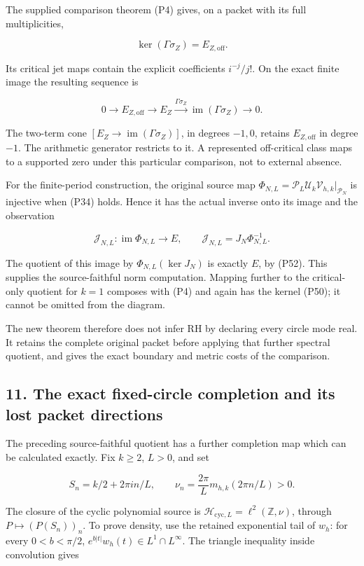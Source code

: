 The supplied comparison theorem (P4) gives, on a packet with its full multiplicities,

\[
\ker(\Gamma\sigma_Z)=E_{Z,\mathrm{off}}.
\tag{P50}
\]

Its critical jet maps contain the explicit coefficients \(i^{-j}/j!\). On the exact finite image the resulting sequence is

\[
0\to E_{Z,\mathrm{off}}\to E_Z
\xrightarrow{\Gamma\sigma_Z}\operatorname{im}(\Gamma\sigma_Z)\to0.
\tag{P51}
\]

The two-term cone \([E_Z\to\operatorname{im}(\Gamma\sigma_Z)]\), in degrees \(-1,0\), retains \(E_{Z,\mathrm{off}}\) in degree \(-1\). The arithmetic generator restricts to it. A represented off-critical class maps to a supported zero under this particular comparison, not to external absence.

For the finite-period construction, the original source map \(\Phi_{N,L}=\mathcal P_L\mathcal U_k\mathcal V_{h,k}|_{\mathcal P_N}\) is injective when (P34) holds. Hence it has the actual inverse onto its image and the observation

\[
\mathcal J_{N,L}:\operatorname{im}\Phi_{N,L}\to E,
\qquad \mathcal J_{N,L}=J_N\Phi_{N,L}^{-1}.
\tag{P52}
\]

The quotient of this image by \(\Phi_{N,L}(\ker J_N)\) is exactly \(E\), by (P52). This supplies the source-faithful norm computation. Mapping further to the critical-only quotient for \(k=1\) composes with (P4) and again has the kernel (P50); it cannot be omitted from the diagram.

The new theorem therefore does not infer RH by declaring every circle mode real. It retains the complete original packet before applying that further spectral quotient, and gives the exact boundary and metric costs of the comparison.

\subsection{11. The exact fixed-circle completion and its lost packet directions}\label{endpoint-periodized_original--the-exact-fixed-circle-completion-and-its-lost-packet-directions}

The preceding source-faithful quotient has a further completion map which can be calculated exactly. Fix \(k\ge2\), \(L>0\), and set

\[
S_n=k/2+2\pi i n/L,\qquad
\nu_n=\frac{2\pi}{L}m_{h,k}(2\pi n/L)>0.
\tag{P53}
\]

The closure of the cyclic polynomial source is \(\mathcal H_{\mathrm{cyc},L}=\ell^2(\mathbb Z,\nu)\), through \(P\mapsto(P(S_n))_n\). To prove density, use the retained exponential tail of \(w_h\): for every \(0<b<\pi/2\), \(e^{b|t|}w_h(t)\in L^1\cap L^\infty\). The triangle inequality inside convolution gives

